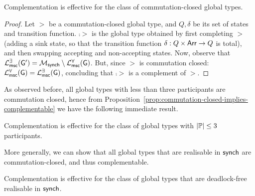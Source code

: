 \begin{proposition}\label{prop:commutation-closed-implies-complementable}
    Complementation is effective for the class of commutation-closed global types.
\end{proposition}

\begin{proof}
Let $\gt$ be a commutation-closed global type, and $Q,\delta$
be its  set of states and transition function. 
 $\comp{\gt}$ is the global type obtained by first completing 
$\gt$ (adding a sink state, so that the transition function $\delta:Q\times\mathsf{Arr}\to Q$ is total),
and then swapping accepting and non-accepting states. 
Now, observe that 
$\mathcal{L}_{\mathsf{msc}}^{\exists}(\mathsf{G}')=
\mathcal{M}_{\mathsf{synch}}
\setminus \mathcal{L}_{\mathsf{msc}}^{\forall}(\mathsf{G})$. But, since $\gt$ is commutation closed:  
$\mathcal{L}_{\mathsf{msc}}^{\forall}(\mathsf{G})=\mathcal{L}_{\mathsf{msc}}^{\exists}(\mathsf{G})$, concluding that 
$\comp{\gt}$ is a complement of $\gt$.
\end{proof}

As observed before, all global types with less than three participants are commutation closed, 
hence from Proposition~\ref{prop:commutation-closed-implies-complementable}
we have the following immediate result.

\begin{corollary}\label{coro:3-participants-complementable}
    Complementation is effective for the class of global types with $\left|\mathbb{P}\right|\leq 3$ participants.
\end{corollary}

More generally, we can show that all global types that are realisable in $\mathsf{synch}$ 
are commutation-closed, and thus complementable.

\begin{theorem}\label{thm:realisable-complementable}
    Complementation is effective for the class of global types that are deadlock-free 
    realisable in $\mathsf{synch}$.
\end{theorem}

